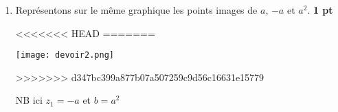 \documentclass[12pt,a4paper]{article}
\begin{document}
\begin{enumerate}
    \[\boxed{\textcolor{green}{\begin{cases}
	    \cos\left(\frac{7\pi}{12}\right)=-\frac{\sqrt{2 - \sqrt{3}}}{2}\\
	    \sin\left(\frac{7\pi}{12}\right)=\frac{\sqrt{2 + \sqrt{3}}}{2}
	    \end{cases}}}\]

    Puis les valeurs exactes de $\cos\left(\frac{\pi}{12}\right)$ et $\sin\left(\frac{\pi}{12}\right)$. \hfill \textbf{0,5 pt}
	     
	Or $\frac{7\pi}{12}=\frac{6\pi+\pi}{12}=\frac{\pi}{12}+\frac{\pi}{2}$
	
	  donc  $
		\begin{cases}
	    \cos\left(\frac{7\pi}{12}\right)=-\frac{\sqrt{2 - \sqrt{3}}}{2}\\
	    \sin\left(\frac{7\pi}{12}\right)=\frac{\sqrt{2 + \sqrt{3}}}{2}
	    \end{cases}\implies
	    \begin{cases}
	    \cos\left(\frac{\pi}{12}+\frac{\pi}{2}\right)=-\frac{\sqrt{2 - \sqrt{3}}}{2}\\
	    \sin\left(\frac{\pi}{12}+\frac{\pi}{2}\right)=\frac{\sqrt{2 + \sqrt{3}}}{2}
	    \end{cases}
	    $
	    
		$
		\begin{cases}
	    -\sin\left(\frac{\pi}{12}\right)=-\frac{\sqrt{2 - \sqrt{3}}}{2}\\
	    \cos\left(\frac{\pi}{12}\right)=\frac{\sqrt{2 + \sqrt{3}}}{2}
	    \end{cases}\implies
	   	\begin{cases}
	    \sin\left(\frac{\pi}{12}\right)=\frac{\sqrt{2 - \sqrt{3}}}{2}\\
	    \cos\left(\frac{\pi}{12}\right)=\frac{\sqrt{2 + \sqrt{3}}}{2}
	    \end{cases}
	    $
	    
    \[\boxed{\textcolor{green}{\begin{cases}
	    \cos\left(\frac{\pi}{12}\right)=\frac{\sqrt{2 + \sqrt{3}}}{2}\\
	    \sin\left(\frac{\pi}{12}\right)=\frac{\sqrt{2 - \sqrt{3}}}{2}
	    \end{cases}}}\]    \hfill \textbf{0,5 pt}
    \item Représentons sur le même graphique les points images de $a$, $-a$ et $a^2$. \hfill \textbf{1 pt}
    
<<<<<<< HEAD
=======
    \begin{center}
    \texttt{[image: devoir2.png]}
\end{center}
>>>>>>> d347bc399a877b07a507259c9d56c16631e15779

NB ici $z_{1}=-a$ et $b=a^{2}$
\end{enumerate}
\end{document}
